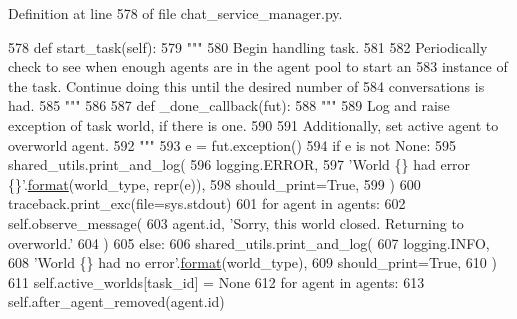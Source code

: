 Definition at line 578 of file chat\+\_\+service\+\_\+manager.\+py.


\begin{DoxyCode}
578     \textcolor{keyword}{def }start\_task(self):
579         \textcolor{stringliteral}{"""}
580 \textcolor{stringliteral}{        Begin handling task.}
581 \textcolor{stringliteral}{}
582 \textcolor{stringliteral}{        Periodically check to see when enough agents are in the agent pool to start an}
583 \textcolor{stringliteral}{        instance of the task. Continue doing this until the desired number of}
584 \textcolor{stringliteral}{        conversations is had.}
585 \textcolor{stringliteral}{        """}
586 
587         \textcolor{keyword}{def }\_done\_callback(fut):
588             \textcolor{stringliteral}{"""}
589 \textcolor{stringliteral}{            Log and raise exception of task world, if there is one.}
590 \textcolor{stringliteral}{}
591 \textcolor{stringliteral}{            Additionally, set active agent to overworld agent.}
592 \textcolor{stringliteral}{            """}
593             e = fut.exception()
594             \textcolor{keywordflow}{if} e \textcolor{keywordflow}{is} \textcolor{keywordflow}{not} \textcolor{keywordtype}{None}:
595                 shared\_utils.print\_and\_log(
596                     logging.ERROR,
597                     \textcolor{stringliteral}{'World \{\} had error \{\}'}.\hyperlink{namespaceparlai_1_1chat__service_1_1services_1_1messenger_1_1shared__utils_a32e2e2022b824fbaf80c747160b52a76}{format}(world\_type, repr(e)),
598                     should\_print=\textcolor{keyword}{True},
599                 )
600                 traceback.print\_exc(file=sys.stdout)
601                 \textcolor{keywordflow}{for} agent \textcolor{keywordflow}{in} agents:
602                     self.observe\_message(
603                         agent.id, \textcolor{stringliteral}{'Sorry, this world closed. Returning to overworld.'}
604                     )
605             \textcolor{keywordflow}{else}:
606                 shared\_utils.print\_and\_log(
607                     logging.INFO,
608                     \textcolor{stringliteral}{'World \{\} had no error'}.\hyperlink{namespaceparlai_1_1chat__service_1_1services_1_1messenger_1_1shared__utils_a32e2e2022b824fbaf80c747160b52a76}{format}(world\_type),
609                     should\_print=\textcolor{keyword}{True},
610                 )
611             self.active\_worlds[task\_id] = \textcolor{keywordtype}{None}
612             \textcolor{keywordflow}{for} agent \textcolor{keywordflow}{in} agents:
613                 self.after\_agent\_removed(agent.id)

\end{DoxyCode}
